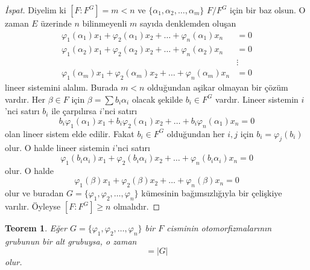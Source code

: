 \documentclass{article}
\newtheorem{thm}{Teorem}[section]
\theoremstyle{definition}
\theoremstyle{remark}
\newcommand{\envert}[1]{\left\lvert#1\right\rvert}
\let\abs=\envert
\begin{document}
    		\begin{proof}[İspat]
    	        Diyelim ki $[F : F^G] = m < n$ ve $\{\alpha_1, \alpha_2, \dots, \alpha_m\}$ $F/F^G$ için bir baz olsun. O zaman $E$ üzerinde $n$ bilinmeyenli $m$ sayıda denklemden oluşan
    	        \begin{align*}
    	            \varphi_1(\alpha_1)x_1 + \varphi_2(\alpha_1)x_2 + \dots + \varphi_n(\alpha_1)x_n &= 0\\
    	            \varphi_1(\alpha_2)x_1 + \varphi_2(\alpha_2)x_2 + \dots + \varphi_n(\alpha_2)x_n &= 0\\
    	            &\vdots\\
    	            \varphi_1(\alpha_m)x_1 + \varphi_2(\alpha_m)x_2 + \dots + \varphi_n(\alpha_m)x_n &= 0
    	        \end{align*}
    	        lineer sistemini alalım. Burada $m < n$ olduğundan aşikar olmayan bir çözüm vardır. Her $\beta \in F$ için $\beta = \sum{b_i\alpha_i}$ olacak şekilde $b_i \in F^G$ vardır. Lineer sistemin $i$'nci satırı $b_i$ ile çarpılırsa $i$'nci satırı
    	        \begin{equation*}
    	            b_i\varphi_1(\alpha_1)x_1 + b_i\varphi_2(\alpha_1)x_2 + \dots + b_i\varphi_n(\alpha_1)x_n = 0
    	        \end{equation*}
    	        olan lineer sistem elde edilir. Fakat $b_i \in F^G$ olduğundan her $i, j$ için $b_i = \varphi_j(b_i)$ olur. O halde lineer sistemin $i$'nci satırı
    	        \begin{equation*}
    	            \varphi_1(b_i\alpha_i)x_1 + \varphi_2(b_i\alpha_i)x_2 + \dots + \varphi_n(b_i\alpha_i)x_n = 0
    	        \end{equation*}
    	        olur. O halde
    	        \begin{equation*}
    	            \varphi_1(\beta)x_1 + \varphi_2(\beta)x_2 + \dots + \varphi_n(\beta)x_n = 0
    	        \end{equation*}
    	        olur ve buradan $G = \{\varphi_1, \varphi_2, \dots, \varphi_n\}$ kümesinin bağımsızlığıyla bir çelişkiye varılır. Öyleyse $[F : F^G] \geq n$ olmalıdır.
    	    \end{proof}
    		
    		\begin{thm}\label{5.4}
    		    Eğer $G = \{\varphi_1, \varphi_2, \dots, \varphi_n\}$ bir $F$ cisminin otomorfizmalarının grubunun bir alt grubuysa, o zaman
    		    \begin{equation*}
    				[F : F^G] = \abs{G}
    			\end{equation*}
    			olur.
    		\end{thm}
    		
\end{document}

